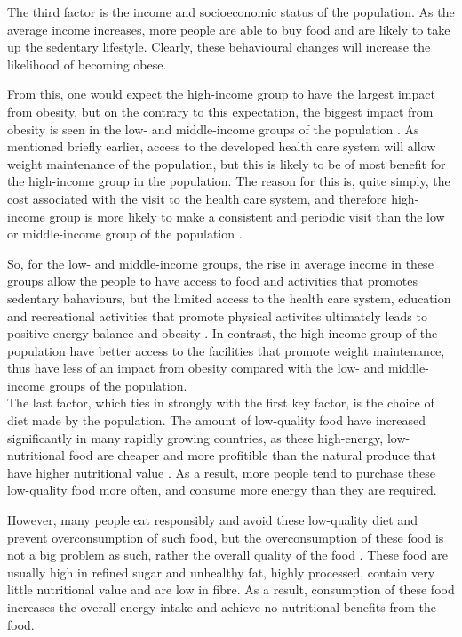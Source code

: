 \noindent
The third factor is the income and socioeconomic status of the population.
As the average income increases, more people are able to buy food and are likely to take up the sedentary lifestyle.
Clearly, these behavioural changes will increase the likelihood of becoming obese.

From this, one would expect the high-income group to have the largest impact from obesity, but on the contrary to this expectation, the biggest impact from obesity is seen in the low- and middle-income groups of the population \citep{Malik2013}.
As mentioned briefly earlier, access to the developed health care system will allow weight maintenance of the population, but this is likely to be of most benefit for the high-income group in the population.
The reason for this is, quite simply, the cost associated with the visit to the health care system, and therefore high-income group is more likely to make a consistent and periodic visit than the low or middle-income group of the population \citep{Malik2013}.

So, for the low- and middle-income groups, the rise in average income in these groups allow the people to have access to food and activities that promotes sedentary bahaviours, but the limited access to the health care system, education and recreational activities that promote physical activites ultimately leads to positive energy balance and obesity \citep{Malik2013}.
In contrast, the high-income group of the population have better access to the facilities that promote weight maintenance, thus have less of an impact from obesity compared with the low- and middle-income groups of the population.\\

\noindent
The last factor, which ties in strongly with the first key factor, is the choice of diet made by the population.
The amount of low-quality food have increased significantly in many rapidly growing countries, as these high-energy, low-nutritional food are cheaper and more profitible than the natural produce that have higher nutritional value \citep{Kearney2010}.
As a result, more people tend to purchase these low-quality food more often, and consume more energy than they are required.

However, many people eat responsibly and avoid these low-quality diet and prevent overconsumption of such food, but the overconsumption of these food is not a big problem as such, rather the overall quality of the food \citep{Malik2013}.
These food are usually high in refined sugar and unhealthy fat, highly processed, contain very little nutritional value and are low in fibre.
As a result, consumption of these food increases the overall energy intake and achieve no nutritional benefits from the food.

